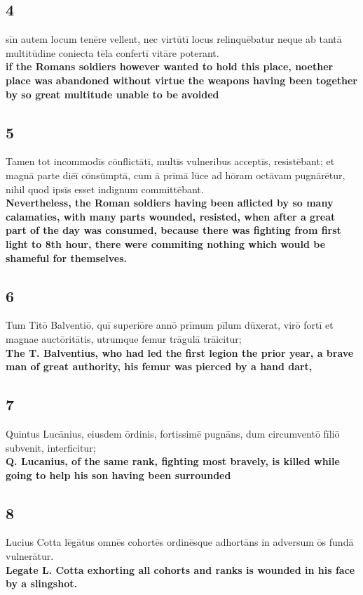 \documentclass{article}
\begin{document}
\subsection*{4}
sīn autem locum tenēre vellent, nec virtūtī locus relinquēbatur neque ab tantā multitūdine coniecta tēla confertī vitāre poterant. \\
\textbf{if the Romans soldiers however wanted to hold this place, noether place was abandoned without virtue the weapons having been together by so great multitude unable to be avoided}

\subsection*{5}
Tamen tot incommodīs cōnflictātī, multīs vulneribus acceptīs, resistēbant; et magnā parte diēī cōnsūmptā, cum ā prīmā lūce ad hōram octāvam pugnārētur, nihil quod ipsīs esset indignum committēbant.\\
\textbf{Nevertheless, the Roman soldiers having been aflicted by so many calamaties, with many parts wounded, resisted, when after a great part of the day was consumed, because there was fighting from first light to 8th hour, there were commiting nothing which would be shameful for themselves. }

\subsection*{6}
Tum Titō Balventiō, quī superiōre annō prīmum pīlum dūxerat, virō fortī et magnae auctōritātis, utrumque femur trāgulā trāicitur; \\
\textbf{The T. Balventius, who had led the first legion the prior year, a brave man of great authority, his femur was pierced by a hand dart,}

\subsection*{7}
Quintus Lucānius, eiusdem ōrdinis, fortissimē pugnāns, dum circumventō fīliō subvenit, interficitur; \\
\textbf{Q. Lucanius, of the same rank, fighting most bravely, is killed while going to help his son having been surrounded}

\subsection*{8}
Lucius Cotta lēgātus omnēs cohortēs ordinēsque adhortāns in adversum ōs fundā vulnerātur.\\
\textbf{Legate L. Cotta exhorting all cohorts and ranks is wounded in his face by a slingshot.}
\end{document}
